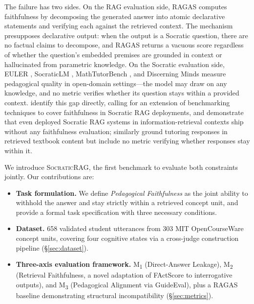 \documentclass[11pt]{article}
\newcommand{\ours}{\textsc{SocraticRAG}\xspace}
\newcommand{\mtwo}{M\textsubscript{2}\xspace}
\newcommand{\mone}{M\textsubscript{1}\xspace}
\newcommand{\mthree}{M\textsubscript{3}\xspace}
\begin{document}
The failure has two sides.
On the RAG evaluation side, RAGAS \citep{es2024ragas} computes faithfulness
by decomposing the generated answer into atomic declarative statements and
verifying each against the retrieved context.
The mechanism presupposes declarative output: when the output is a Socratic
question, there are no factual claims to decompose, and RAGAS returns a
vacuous score regardless of whether the question's embedded premises are
grounded in context or hallucinated from parametric knowledge.
On the Socratic evaluation side, EULER \citep{bonino2024euler},
SocraticLM \citep{liuj2024socraticlm}, MathTutorBench
\citep{macina2025mathtutorbench}, and Discerning Minds
\citep{liuy2025discerning} measure pedagogical quality in open-domain
settings---the model may draw on any knowledge, and no metric verifies
whether its question stays within a provided context.
\citet{ilkou2024hybrid} identify this gap directly, calling for an extension
of benchmarking techniques to cover faithfulness in Socratic RAG deployments,
and \citet{lefton2025socratic} demonstrate that even deployed Socratic RAG
systems in information-retrieval contexts ship without any faithfulness
evaluation; \citet{chevalier2024language} similarly ground tutoring responses
in retrieved textbook content but include no metric verifying whether
responses stay within it.

We introduce \ours, the first benchmark to evaluate both constraints jointly.
Our contributions are:

\begin{itemize}[nosep]

  \item \textbf{Task formulation.}
  We define \textit{Pedagogical Faithfulness} as the joint ability to
  withhold the answer and stay strictly within a retrieved concept unit,
  and provide a formal task specification with three necessary conditions.

  \item \textbf{Dataset.}
  658 validated student utterances from 303 MIT OpenCourseWare concept
  units, covering four cognitive states via a cross-judge construction
  pipeline (\S\ref{sec:dataset}).

  \item \textbf{Three-axis evaluation framework.}
  \mone{} (Direct-Answer Leakage), \mtwo{} (Retrieval Faithfulness,
  a novel adaptation of FActScore to interrogative outputs), and
  \mthree{} (Pedagogical Alignment via GuideEval), plus a RAGAS baseline
  demonstrating structural incompatibility (\S\ref{sec:metrics}).

\end{itemize}
\end{document}

